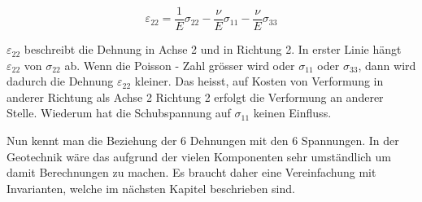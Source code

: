 \[
\varepsilon_{22}
=
\frac{1}{E}\sigma_{22} - \frac{\nu}{E}\sigma_{11} - \frac{\nu}{E}\sigma_{33}
\]

$\varepsilon_{22}$ beschreibt die Dehnung in Achse 2 und in Richtung 2.
In erster Linie hängt $\varepsilon_{22}$ von $\sigma_{22}$ ab.
Wenn die Poisson - Zahl grösser wird oder $\sigma_{11}$ oder $\sigma_{33}$, dann wird dadurch die Dehnung $\varepsilon_{22}$ kleiner.
Das heisst, auf Kosten von Verformung in anderer Richtung als Achse 2 Richtung 2 erfolgt die Verformung an anderer Stelle.
Wiederum hat die Schubspannung auf $\sigma_{11}$ keinen Einfluss.

Nun kennt man die Beziehung der 6 Dehnungen mit den 6 Spannungen.
In der Geotechnik wäre das aufgrund der vielen Komponenten sehr umständlich um damit Berechnungen zu machen.
Es braucht daher eine Vereinfachung mit Invarianten, welche im nächsten Kapitel beschrieben sind.

